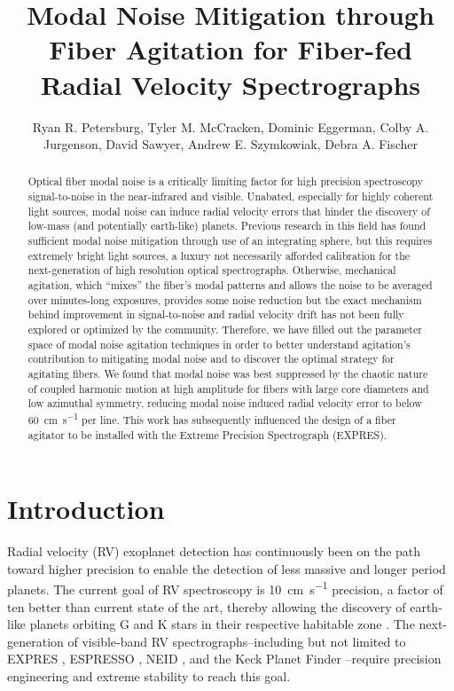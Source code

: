 \documentclass[twocolumn]{emulateapj}
\begin{document}
\title{Modal Noise Mitigation through Fiber Agitation for Fiber-fed Radial Velocity Spectrographs}

\author{Ryan R. Petersburg, Tyler M. McCracken, Dominic Eggerman, Colby A. Jurgenson, David Sawyer, Andrew E. Szymkowiak, Debra A. Fischer}

\begin{abstract}

Optical fiber modal noise is a critically limiting factor for high precision spectroscopy signal-to-noise in the near-infrared and visible. Unabated, especially for highly coherent light sources, modal noise can induce radial velocity errors that hinder the discovery of low-mass (and potentially earth-like) planets. Previous research in this field has found sufficient modal noise mitigation through use of an integrating sphere, but this requires extremely bright light sources, a luxury not necessarily afforded calibration for the next-generation of high resolution optical spectrographs. Otherwise, mechanical agitation, which ``mixes'' the fiber's modal patterns and allows the noise to be averaged over minutes-long exposures, provides some noise reduction but the exact mechanism behind improvement in signal-to-noise and radial velocity drift has not been fully explored or optimized by the community. Therefore, we have filled out the parameter space of modal noise agitation techniques in order to better understand agitation's contribution to mitigating modal noise and to discover the optimal strategy for agitating fibers. We found that modal noise was best suppressed by the chaotic nature of coupled harmonic motion at high amplitude for fibers with large core diameters and low azimuthal symmetry, reducing modal noise induced radial velocity error to below \SI{60}{\centi\meter\per\second} per line. This work has subsequently influenced the design of a fiber agitator to be installed with the Extreme Precision Spectrograph (EXPRES).

\end{abstract}


\section{Introduction}
\label{sec:intro}

Radial velocity (RV) exoplanet detection has continuously been on the path toward higher precision to enable the detection of less massive and longer period planets. The current goal of RV spectroscopy is \SI{10}{\centi\meter\per\second} precision, a factor of ten better than current state of the art, thereby allowing the discovery of earth-like planets orbiting G and K stars in their respective habitable zone \citep{Fischer2016}. The next-generation of visible-band RV spectrographs--including but not limited to EXPRES \citep{Jurgenson2016}, ESPRESSO \citep{Megevand2012}, NEID \citep{Schwab2016}, and the Keck Planet Finder \citep{Gibson2016}--require precision engineering and extreme stability to reach this goal.
\end{document}
